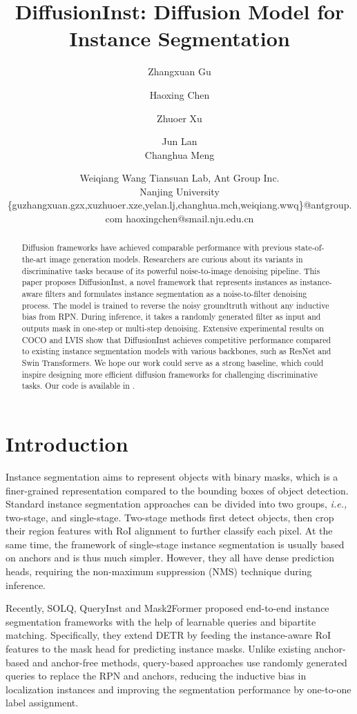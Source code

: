 \documentclass{article}
\title{DiffusionInst: Diffusion Model for Instance Segmentation}
\author{
Zhangxuan Gu
\and
Haoxing Chen\and
Zhuoer Xu\and
Jun Lan \\
Changhua Meng\and
Weiqiang Wang
\affiliations
Tiansuan Lab, Ant Group Inc.\\
Nanjing University
\emails
 \{guzhangxuan.gzx,xuzhuoer.xze,yelan.lj,changhua.mch,weiqiang.wwq\}@antgroup.com haoxingchen@smail.nju.edu.cn}
\begin{document}
\maketitle

\begin{abstract}
Diffusion frameworks have achieved comparable performance with previous state-of-the-art image generation models. Researchers are curious about its variants in discriminative tasks because of its powerful noise-to-image denoising pipeline. This paper proposes DiffusionInst, a novel framework that represents instances as instance-aware filters and formulates instance segmentation as a noise-to-filter denoising process. The model is trained to reverse the noisy groundtruth without any inductive bias from RPN.
During inference, it takes a randomly generated filter as input and outputs mask in one-step or multi-step denoising. Extensive experimental results on COCO and LVIS show that DiffusionInst achieves competitive performance compared to existing instance segmentation models with various backbones, such as ResNet and Swin Transformers. We hope our work could serve as a strong baseline, which could inspire designing more efficient diffusion frameworks for challenging discriminative tasks. Our code is available in \textit{}.
\end{abstract}

\section{Introduction}

Instance segmentation aims to represent objects with binary masks, which is a finer-grained representation compared to the bounding boxes of object detection. Standard instance segmentation approaches can be divided into two groups, {\em i.e.,} two-stage\cite{maskrcnn,PANet,maskscoringrcnn}, and single-stage\cite{BlendMask,YOLACT,SOLO,SOLOv2,CondInst}. Two-stage methods first detect objects, then crop their region features with RoI alignment to further classify each pixel. At the same time, the framework of single-stage instance segmentation is usually based on anchors and is thus much simpler. However, they all have dense prediction heads, requiring the non-maximum suppression (NMS) technique during inference.



Recently, SOLQ\cite{dong2021solq}, QueryInst\cite{QueryInst} and Mask2Former\cite{Mask2Former} proposed end-to-end instance segmentation frameworks with the help of learnable queries and bipartite matching. Specifically, they extend DETR\cite{DETR} by feeding the instance-aware RoI features to the mask head for predicting instance masks. Unlike existing anchor-based and anchor-free methods, query-based approaches use randomly generated queries to replace the RPN and anchors, reducing the inductive bias in localization instances and improving the segmentation performance by one-to-one label assignment.
\end{document}
